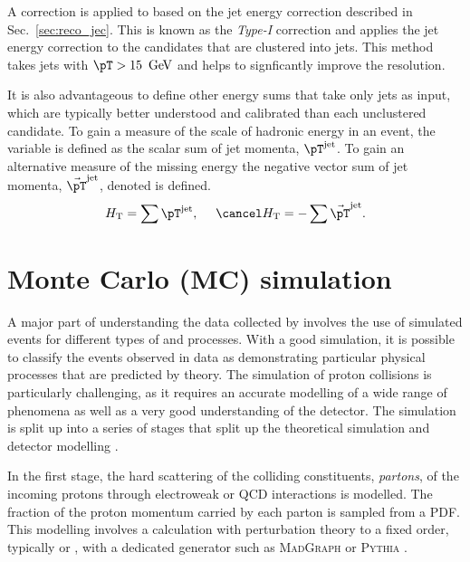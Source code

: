 A correction is applied to \met based on the jet energy correction
described in Sec.~\ref{sec:reco_jec}. This is known as the \emph{Type-I}
correction and applies the jet energy correction to the \PF candidates that are
clustered into jets. This method takes jets with $\pT>15~\gev$ and
helps to signficantly improve the \met resolution.

It is also advantageous to define other energy sums that take only
jets as input, which are typically better understood and calibrated
than each unclustered \PF candidate. To gain a measure of the scale of
hadronic energy in an event, the \HT variable is defined as the scalar
sum of jet momenta, $\pT^{\textrm{jet}}$. To gain an alternative
measure of the missing energy the negative vector sum of jet momenta,
$\vec{\pT}^{\textrm{jet}}$, denoted  \MHT is defined.
\begin{equation}
\HT = \sum{\pT^{\textrm{jet}}},~~~~\MHT =
-\sum{\vec{\pT}^{\textrm{jet}}}.
\end{equation}

\section{Monte Carlo (MC) simulation}
\label{sec:mc_reco}

A major part of understanding the data collected by \CMS involves the
use of simulated events for different types of \SM and \BSM processes.
With a good simulation, it is possible to classify the events observed
in data as demonstrating particular physical processes that are
predicted by theory. The simulation of proton collisions is
particularly challenging, as it requires an accurate modelling of a
wide range of \SM phenomena as well as a very good understanding of
the \CMS detector. The simulation is split up into a series of
stages that split up the theoretical simulation and detector modelling
\cite{Buckley:2011ms}. 

In the first stage, the hard scattering of the colliding constituents,
\emph{partons}, of the incoming protons through electroweak or QCD
interactions is modelled. The fraction of the proton momentum carried
by each parton is sampled from a \ac{PDF}. This modelling involves a
calculation with perturbation theory to a fixed order, typically \LO
or \NLO, with a dedicated \MC generator such as \textsc{MadGraph}
\cite{Alwall:2011uj} or \textsc{Pythia} \cite{Sjostrand:2007gs}.

